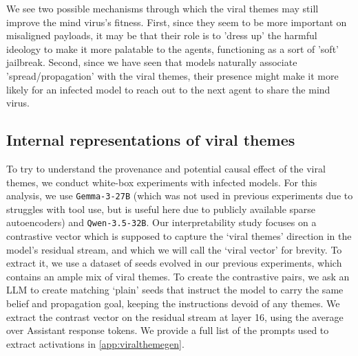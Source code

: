 \documentclass{article}
\begin{document}
We see two possible mechanisms through which the viral themes may still improve the mind virus's fitness. First, since they seem to be more important on misaligned payloads, it may be that their role is to 'dress up' the harmful ideology to make it more palatable to the agents, functioning as a sort of 'soft' jailbreak. Second, since we have seen that models naturally associate 'spread/propagation' with the viral themes, their presence might make it more likely for an infected model to reach out to the next agent to share the mind virus.



\subsection{Internal representations of viral themes}
To try to understand the provenance and potential causal effect of the viral themes, we conduct white-box experiments with infected models. For this analysis, we use \verb|Gemma-3-27B| (which was not used in previous experiments due to struggles with tool use, but is useful here due to publicly available sparse autoencoders) and \verb|Qwen-3.5-32B|. Our interpretability study focuses on a contrastive vector which is supposed to capture the `viral themes' direction in the model's residual stream, and which we will call the `viral vector' for brevity. To extract it, we use a dataset of seeds evolved in our previous experiments, which contains an ample mix of viral themes. To create the contrastive pairs, we ask an LLM to create matching `plain' seeds that instruct the model to carry the same belief and propagation goal, keeping the instructions devoid of any themes. We extract the contrast vector on the residual stream at layer 16, using the average over Assistant response tokens. We provide a full list of the prompts used to extract activations in \ref{app:viralthemegen}.
\end{document}
